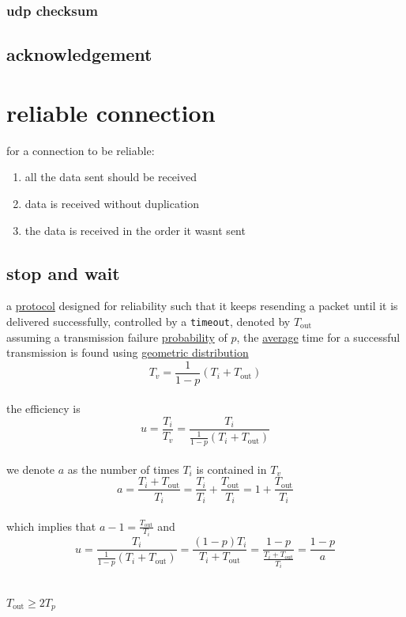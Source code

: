 \documentclass[a4paper,12pt]{article}
\begin{document}
\subsubsection{udp checksum}
\label{sec:org532a959}
\subsection{acknowledgement}
\label{sec:org152b6fe}
\section{reliable connection}
\label{sec:org80dc2f3}
for a connection to be reliable:\\
\begin{enumerate}
\item all the data sent should be received\\
\item data is received without duplication\\
\item the data is received in the order it wasnt sent\\
\end{enumerate}
\subsection{stop and wait}
\label{sec:orgfe37c48}
a \hyperref[sec:org040283e]{protocol} designed for reliability such that it keeps resending a packet until it is delivered successfully, controlled by a \texttt{timeout}, denoted by \(T_\text{out}\)\\
assuming a transmission failure \href{20220813151352-probability.org}{probability} of \(p\), the \href{20220813152209-average.org}{average} time for a successful transmission is found using \href{20220813151352-probability.org}{geometric distribution}\\
\[
T_v = \frac{1}{1-p}(T_i+T_\text{out})
\]\\
the efficiency is\\
\[
u = \frac{T_i}{T_v} = \frac{T_i}{\frac{1}{1-p}(T_i+T_\text{out})}
\]\\
we denote \(a\) as the number of times \(T_i\) is contained in \(T_v\)\\
\[
a = \frac{T_i+T_\text{out}}{T_i} = \frac{T_i}{T_i} + \frac{T_\text{out}}{T_i} = 1 + \frac{T_\text{out}}{T_i}
\]\\
which implies that \(a-1=\frac{T_\text{out}}{T_i}\) and\\
\[
u = \frac{T_i}{\frac{1}{1-p}(T_i+T_\text{out})} = \frac{(1-p)T_i}{T_i+T_\text{out}} = \frac{1-p}{\frac{T_i+T_\text{out}}{T_i}} = \frac{1-p}{a}
\]\\
\begin{lemma}
\(T_\text{out} \geq 2T_p\)\\
\end{lemma}
\end{document}
